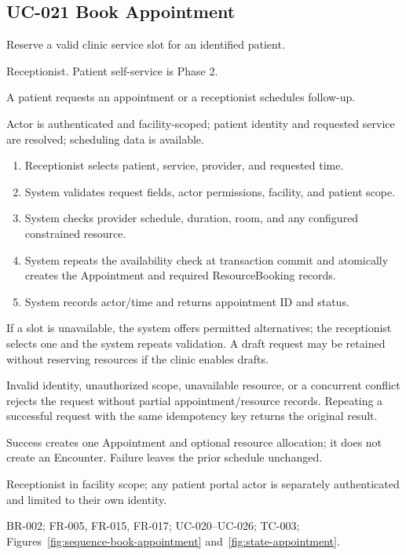 \documentclass[a4paper,12pt]{article}
\begin{document}
\subsection{UC-021 Book Appointment}
\begin{description}[leftmargin=2.6cm,style=nextline]
\item[Goal] Reserve a valid clinic service slot for an identified patient.
\item[Primary actor] Receptionist. Patient self-service is Phase 2.
\item[Trigger] A patient requests an appointment or a receptionist schedules follow-up.
\item[Preconditions] Actor is authenticated and facility-scoped; patient identity and requested service are resolved; scheduling data is available.
\item[Main success flow]
\begin{enumerate}[leftmargin=1.4em]
  \item Receptionist selects patient, service, provider, and requested time.
  \item System validates request fields, actor permissions, facility, and patient scope.
  \item System checks provider schedule, duration, room, and any configured constrained resource.
  \item System repeats the availability check at transaction commit and atomically creates the Appointment and required ResourceBooking records.
  \item System records actor/time and returns appointment ID and status.
\end{enumerate}
\item[Alternative flows] If a slot is unavailable, the system offers permitted alternatives; the receptionist selects one and the system repeats validation. A draft request may be retained without reserving resources if the clinic enables drafts.
\item[Exception flows] Invalid identity, unauthorized scope, unavailable resource, or a concurrent conflict rejects the request without partial appointment/resource records. Repeating a successful request with the same idempotency key returns the original result.
\item[Postconditions and data] Success creates one Appointment and optional resource allocation; it does not create an Encounter. Failure leaves the prior schedule unchanged.
\item[Authorization] Receptionist in facility scope; any patient portal actor is separately authenticated and limited to their own identity.
\item[Trace] BR-002; FR-005, FR-015, FR-017; UC-020--UC-026; TC-003; Figures~\ref{fig:sequence-book-appointment} and~\ref{fig:state-appointment}.
\end{description}
\end{document}
